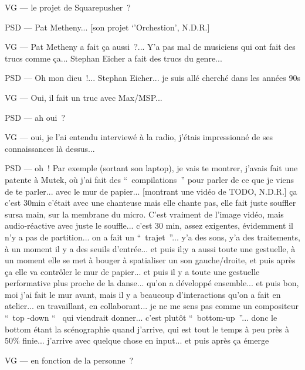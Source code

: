 VG — le projet de Squarepusher ?

PSD — Pat Metheny... [son projet `'Orchestion', N.D.R.]

VG — Pat Metheny a fait ça aussi ?... Y'a pas mal de musiciens qui ont fait des trucs comme ça... Stephan Eicher a fait des trucs du genre...

PSD — Oh mon dieu !... Stephan Eicher... je suis allé cherché dans les années 90s

VG — Oui, il fait un truc avec Max/MSP...

PSD — ah oui ?

VG — oui, je l'ai entendu interviewé à la radio, j'étais impressionné de ses connaissances là dessus...

PSD — oh ! Par exemple (sortant son laptop), je vais te montrer, j'avais fait une patente à Mutek, où j'ai fait des “ compilations ” pour parler de ce que je viens de te parler... avec le mur de papier... [montrant une vidéo de TODO, N.D.R.] ça c'est 30min c'était avec une chanteuse mais elle chante pas, elle fait juste souffler sursa main, sur  la membrane du micro. C'est vraiment de l'image vidéo, mais audio-réactive avec juste le souffle... c'est 30 min, assez exigentes, évidemment il n'y a pas de partition... on a fait un “ trajet ”... y'a des sons, y'a des traitements, à un moment il y a des seuils d'entrée... et puis il;y a aussi toute une gestuelle, à un moment elle se met à bouger à spatialiser un son gauche/droite, et puis après ça elle va contrôler le mur de papier... et puis il y a toute une gestuelle performative plus proche de la danse... qu'on a développé ensemble... et puis bon, moi j'ai fait le mur avant, mais il y a beaucoup d'interactions qu'on a fait en atelier... en travaillant, en collaborant... je ne me sens pas comme un compositeur “ top -down “  qui viendrait donner... c'est plutôt “ bottom-up ”... donc le bottom étant la scénographie quand j'arrive, qui est tout le temps à peu près à 50\% finie... j'arrive avec quelque chose en input... et puis après ça émerge

VG — en fonction de la personne ?

